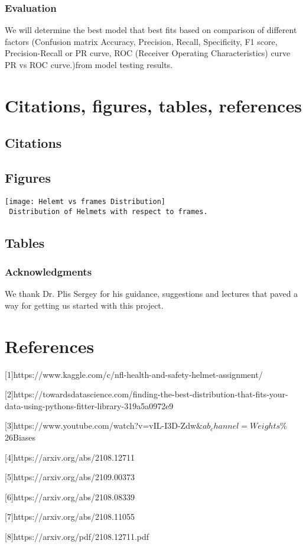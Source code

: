 \documentclass{article}
\begin{document}
\subsubsection{Evaluation}
We will determine the best model that best fits based on comparison of different factors (Confusion matrix
Accuracy,
Precision,
Recall,
Specificity,
F1 score,
Precision-Recall or PR curve,
ROC (Receiver Operating Characteristics) curve
PR vs ROC curve.)from model testing results.
\section{Citations, figures, tables, references}
\label{others}

\subsection{Citations}

\subsection{Figures}
\texttt{[image: Helemt vs frames Distribution]}\\
\texttt{ Distribution of Helmets with respect to frames.}
\subsection{Tables}

\subsubsection*{Acknowledgments}

We thank Dr. Plis Sergey for his guidance, suggestions and lectures that paved a way for getting us started with this project.

\section*{References}

\medskip

\small
[1]https://www.kaggle.com/c/nfl-health-and-safety-helmet-assignment/

[2]https://towardsdatascience.com/finding-the-best-distribution-that-fits-your-data-using-pythons-fitter-library-319a5a0972e9

[3]https://www.youtube.com/watch?v=vIL-I3D-Zdw$\&ab_channel=Weights\%$26Biases

[4]https://arxiv.org/abs/2108.12711

[5]https://arxiv.org/abs/2109.00373

[6]https://arxiv.org/abs/2108.08339

[7]https://arxiv.org/abs/2108.11055

[8]https://arxiv.org/pdf/2108.12711.pdf
\end{document}
